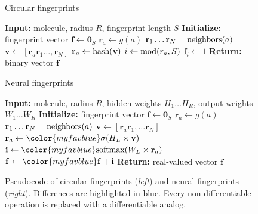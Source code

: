 \documentclass{article}
\newcommand{\vv}{\mathbf{v}}
\newcommand{\vf}{\mathbf{f}}
\newcommand{\vi}{\mathbf{i}}
\newcommand{\vr}{\mathbf{r}}
\newcommand{\vzero}{\mathbf{0}}
\begin{document}
\begin{figure}[t]
 \begin{minipage}[t]{0.49\columnwidth}
 \begin{algorithm}[H]
\caption{Circular fingerprints} 
\label{alg:ecfp} 
\begin{algorithmic}[1]
\State \textbf{Input:} {molecule, radius $R$, fingerprint length $S$}
\State \textbf{Initialize:} {fingerprint vector $\vf \leftarrow \vzero_S$}
    \State $\vr_a \leftarrow g(a)$ 
\EndFor
{} 
		\State $\vr_{1} \dots \vr_{N} = \textnormal{neighbors}(a)$
		\State $\vv \leftarrow [\vr_a \vr_{1} \dots, \vr_{N}]$ 
		\State $\vr_a \leftarrow \textnormal{hash}(\vv)$ 
		\State $i \leftarrow \textnormal{mod}(r_a, S)$ 		
		\State $\vf_{i} \leftarrow 1$ 
	\EndFor
\EndFor
\State \textbf{Return:} {binary vector $\vf$}
\end{algorithmic}
\end{algorithm}
\end{minipage}
\hfill
\begin{minipage}[t]{0.49\columnwidth}
\begin{algorithm}[H]
\caption{Neural fingerprints} 
\label{alg:neural} 
\begin{algorithmic}[1]
\State \textbf{Input:} {molecule, radius $R$, {\color{myfavblue} hidden weights $H_1 \dots H_R$, output weights $W_1 \dots W_R$}}
\State \textbf{Initialize:} {fingerprint vector $\vf \leftarrow \vzero_S$}
	\State $\vr_a \leftarrow g(a)$ 
\EndFor
{} 
		\State $\vr_{1} \dots \vr_{N} = \textnormal{neighbors}(a)$
		\State $\vv \leftarrow [\vr_a \vr_{1}, \dots \vr_{N}]$ 
		\State $\vr_a \leftarrow {\color{myfavblue} \sigma(H_L \times \vv)}$ 
		\State $\vi \leftarrow {\color{myfavblue} \textnormal{softmax}(W_L \times \vr_a)}$ 
		\State $\vf \leftarrow {\color{myfavblue} \vf + \vi}$ 
    \EndFor
\EndFor
\State \textbf{Return:} { {\color{myfavblue} real-valued} vector $\vf$}
\end{algorithmic}
\end{algorithm}
\end{minipage}
\hfill
\caption{Pseudocode of circular fingerprints (\emph{left}) and neural fingerprints (\emph{right}).
Differences are highlighted in blue.
Every non-differentiable operation is replaced with a differentiable analog.}
\end{figure}
\end{document}

